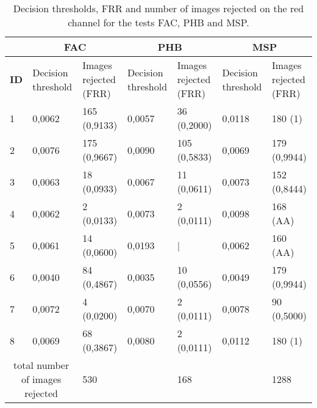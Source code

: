 


\begin{table*}[htb]
\centering
\caption{Decision thresholds, FRR and number of images rejected on the red channel for the tests FAC, PHB and MSP.}
\begin{tabular}{  | p{1.8cm}   | p{1.8cm} | p{1.8cm}  |  p{1.8cm} | p{1.8cm}  | p{1.8cm} | p{1.8cm}  |} 
\hline
& \multicolumn{2}{|c|}{ \textbf{FAC} } & \multicolumn{2}{|c|}{ \textbf{PHB} }  & \multicolumn{2}{|c|}{ \textbf{MSP} }\\ \hline
{\textbf{ID}}& Decision threshold& Images rejected (FRR) & Decision threshold& Images rejected (FRR) & Decision threshold& Images rejected (FRR)  \\ \hline

1 &	0,0062		& 	165 (0,9133)	& 0,0057			& 36 (0,2000)		&	0,0118		   	&		180 (1)	 \\
2 &	0,0076		& 	175 (0,9667)	& 0,0090			& 105 (0,5833)		&	0,0069		   	&		179 (0,9944)	 \\ 
3 &	0,0063		& 	18 (0,0933)	& 0,0067			& 11 (0,0611)		&	0,0073			&		152 (0,8444)  \\ 
4 &	0,0062	 	& 	2 (0,0133) 	& 0,0073			& 2 (0,0111)		&	0,0098			&		168 (AA) 	\\ 
5 & 	0,0061 	 	&	14 (0,0600)	& 0,0193			& |				& 	0,0062			& 		160 (AA) \\
6 &	0,0040  		&	84 (0,4867) 	& 0,0035			& 10 (0,0556)		&	0,0049			&		179 (0,9944) \\ 
7 &	0,0072  		&	4 (0,0200)	& 0,0070			& 2 (0,0111)		&	0,0078			&		90 (0,5000) \\
8 &	0,0069  		&	68 (0,3867)	& 0,0080			& 2 (0,0111)		&	0,0112			&		180 (1)	 \\ \hline \hline\hline \hline
\multicolumn{2}{|c|}{total number of images rejected} & 530 & & 168 & & 1288 \\
\hline
\end{tabular}
\label{socialNetworkExp}
\end{table*}
